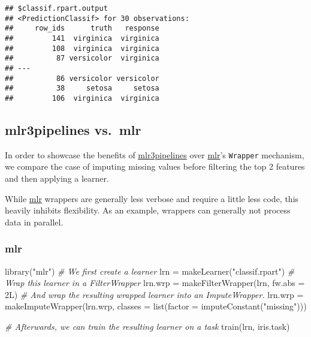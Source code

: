 \documentclass[
]{scrbook}
\newenvironment{Shaded}{\begin{snugshade}}{\end{snugshade}}
\newcommand{\AttributeTok}[1]{\textcolor[rgb]{0.77,0.63,0.00}{#1}}
\newcommand{\CommentTok}[1]{\textcolor[rgb]{0.56,0.35,0.01}{\textit{#1}}}
\newcommand{\FunctionTok}[1]{\textcolor[rgb]{0.00,0.00,0.00}{#1}}
\newcommand{\NormalTok}[1]{#1}
\newcommand{\OtherTok}[1]{\textcolor[rgb]{0.56,0.35,0.01}{#1}}
\newcommand{\StringTok}[1]{\textcolor[rgb]{0.31,0.60,0.02}{#1}}
\renewenvironment{Shaded} {\begin{snugshade}\small} {\end{snugshade}}
\begin{document}
\begin{verbatim}
## $classif.rpart.output
## <PredictionClassif> for 30 observations:
##     row_ids      truth   response
##         141  virginica  virginica
##         108  virginica  virginica
##          87 versicolor  virginica
## ---                              
##          86 versicolor versicolor
##          38     setosa     setosa
##         106  virginica  virginica
\end{verbatim}

\hypertarget{mlr3pipelines-vs.-mlr}{%
\subsection{mlr3pipelines vs.~mlr}\label{mlr3pipelines-vs.-mlr}}

In order to showcase the benefits of \href{https://cran.r-project.org/package=mlr3pipelines}{mlr3pipelines} over \href{https://cran.r-project.org/package=mlr}{mlr}'s \texttt{Wrapper} mechanism, we compare the case of imputing missing values before filtering the top 2 features and then applying a learner.

While \href{https://cran.r-project.org/package=mlr}{mlr} wrappers are generally less verbose and require a little less code, this heavily inhibits flexibility.
As an example, wrappers can generally not process data in parallel.

\hypertarget{mlr}{%
\subsubsection{mlr}\label{mlr}}

\begin{Shaded}
\begin{Highlighting}[]
\FunctionTok{library}\NormalTok{(}\StringTok{"mlr"}\NormalTok{)}
\CommentTok{\# We first create a learner}
\NormalTok{lrn }\OtherTok{=} \FunctionTok{makeLearner}\NormalTok{(}\StringTok{"classif.rpart"}\NormalTok{)}
\CommentTok{\# Wrap this learner in a FilterWrapper}
\NormalTok{lrn.wrp }\OtherTok{=} \FunctionTok{makeFilterWrapper}\NormalTok{(lrn, }\AttributeTok{fw.abs =}\NormalTok{ 2L)}
\CommentTok{\# And wrap the resulting wrapped learner into an ImputeWrapper.}
\NormalTok{lrn.wrp }\OtherTok{=} \FunctionTok{makeImputeWrapper}\NormalTok{(lrn.wrp, }\AttributeTok{classes =} \FunctionTok{list}\NormalTok{(}\AttributeTok{factor =} \FunctionTok{imputeConstant}\NormalTok{(}\StringTok{"missing"}\NormalTok{)))}

\CommentTok{\# Afterwards, we can train the resulting learner on a task}
\FunctionTok{train}\NormalTok{(lrn, iris.task)}
\end{Highlighting}
\end{Shaded}
\end{document}
